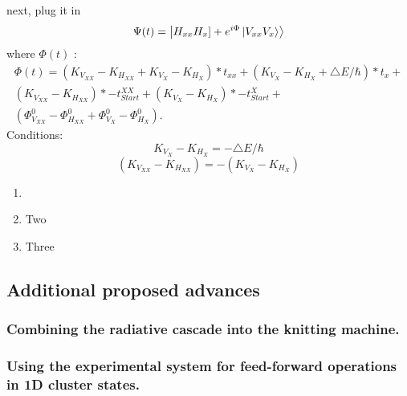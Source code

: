 next, plug it in
\begin{equation}
	\Psi(t) = \ket{H_{xx}H_x]+e^{i\Phi}\ket{V_{xx}V_x}}
\end{equation}
where $\Phi(t)$ :
\begin{equation}
\begin{split}  
	\Phi(t) = (K_{V_{XX}}-K_{H_{XX}}+K_{V_X} - K_{H_X})*t_{xx}+(K_{V_X}-K_{H_X} + \triangle E/\hbar)*t_x +\\
 (K_{V_{XX}} - K_{H_{XX}})*-t^{XX}_{Start} +(K_{V_X}-K_{H_X})*-t^X_{Start}+\\
 (\Phi^0_{V_{XX}}-\Phi^0_{H_{XX}}+\Phi^0_{V_{X}}-\Phi^0_{H_{X}}).
 \end{split}
\end{equation}
Conditions:
\begin{equation}
	K_{V_X}-K_{H_X} = -\triangle E/\hbar
\end{equation}
\begin{equation}
	(K_{V_{XX}} -K_{H_{XX}}) = -(K_{V_X}-K_{H_X})
\end{equation}
\begin{enumerate}
	\item 
	\item  Two
	\item  Three
\end{enumerate}
\subsection{Additional proposed advances}
\subsubsection{Combining the radiative cascade into the knitting machine.}
\subsubsection{Using the experimental system for feed-forward operations in 1D cluster states.}